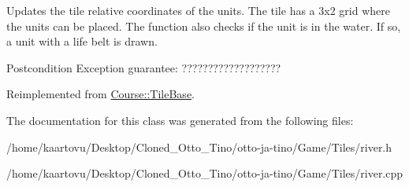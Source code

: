 Updates the tile relative coordinates of the units. The tile has a 3x2 grid where the units can be placed. The function also checks if the unit is in the water. If so, a unit with a life belt is drawn. 

\begin{DoxyPostcond}{Postcondition}
Exception guarantee\-: ??????????????????? 
\end{DoxyPostcond}


Reimplemented from \hyperlink{class_course_1_1_tile_base_a161cb46028a65ca20ece683314a8fa46}{Course\-::\-Tile\-Base}.



The documentation for this class was generated from the following files\-:\begin{DoxyCompactItemize}
\item 
/home/kaartovu/\-Desktop/\-Cloned\-\_\-\-Otto\-\_\-\-Tino/otto-\/ja-\/tino/\-Game/\-Tiles/river.\-h\item 
/home/kaartovu/\-Desktop/\-Cloned\-\_\-\-Otto\-\_\-\-Tino/otto-\/ja-\/tino/\-Game/\-Tiles/river.\-cpp\end{DoxyCompactItemize}
